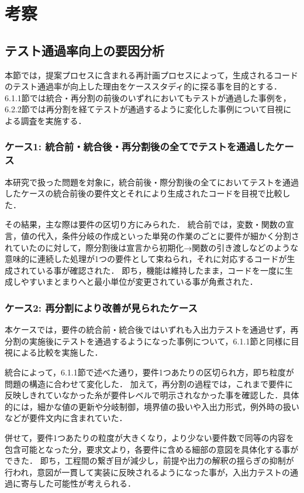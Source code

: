 \documentclass[submit,techrep,noauthor]{ipsj}
\begin{document}
\section{考察}
\label{sec:discussion}
\subsection{テスト通過率向上の要因分析}
本節では，提案プロセスに含まれる再計画プロセスによって，生成されるコードのテスト通過率が向上した理由をケーススタディ的に探る事を目的とする．
6.1.1節では統合・再分割の前後のいずれにおいてもテストが通過した事例を，6.2.2節では再分割を経てテストが通過するように変化した事例について目視による調査を実施する．

\subsubsection{ケース1: 統合前・統合後・再分割後の全てでテストを通過したケース}
本研究で扱った問題を対象に，統合前後・際分割後の全てにおいてテストを通過したケースの統合前後の要件文とそれにより生成されたコードを目視で比較した．

その結果，主な際は要件の区切り方にみられた．
統合前では，変数・関数の宣言，値の代入，条件分岐の作成といった単発の作業のごとに要件が細かく分割されていたのに対して，際分割後は宣言から初期化→関数の引き渡しなどのような意味的に連続した処理が1つの要件として束ねられ，それに対応するコードが生成されている事が確認された．
即ち，機能は維持したまま，コードを一度に生成しやすいまとまりへと最小単位が変更されている事が角煮された．

\subsubsection{ケース2: 再分割により改善が見られたケース}
本ケースでは，要件の統合前・統合後ではいずれも入出力テストを通過せず，再分割の実施後にテストを通過するようになった事例について，6.1.1節と同様に目視による比較を実施した．

統合によって，6.1.1節で述べた通り，要件1つあたりの区切られ方，即ち粒度が問題の構造に合わせて変化した．
加えて，再分割の過程では，これまで要件に反映しきれていなかった糸が要件レベルで明示されなかった事を確認した．具体的には，細かな値の更新や分岐制御，境界値の扱いや入出力形式，例外時の扱いなどが要件文内に含まれていた．

併せて，要件1つあたりの粒度が大きくなり，より少ない要件数で同等の内容を包含可能となった分，要求文より，各要件に含める細部の意図を具体化する事ができた．
即ち，工程間の繋ぎ目が減少し，前提や出力の解釈の揺らぎの抑制が行われ，意図が一貫して実装に反映されるようになった事が，入出力テストの通過に寄与した可能性が考えられる．
\end{document}
